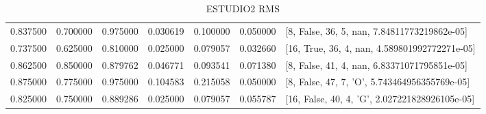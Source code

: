 \begin{table}[!htb]
{\begin{tabular}{cccc}
0.837500 & 0.700000 & 0.975000 & 0.030619 & 0.100000 & 0.050000 & [8, False, 36, 5, nan, 7.84811773219862e-05] \\
0.737500 & 0.625000 & 0.810000 & 0.025000 & 0.079057 & 0.032660 & [16, True, 36, 4, nan, 4.589801992772271e-05] \\
0.862500 & 0.850000 & 0.879762 & 0.046771 & 0.093541 & 0.071380 & [8, False, 41, 4, nan, 6.83371071795851e-05] \\
0.875000 & 0.775000 & 0.975000 & 0.104583 & 0.215058 & 0.050000 & [8, False, 47, 7, 'O', 5.743464956355769e-05] \\
0.825000 & 0.750000 & 0.889286 & 0.025000 & 0.079057 & 0.055787 & [16, False, 40, 4, 'G', 2.027221828926105e-05] \\
\bottomrule
\end{tabular}
}
\caption{ESTUDIO2 RMS}
\label{tab:estudio2_rms}
\end{table}
